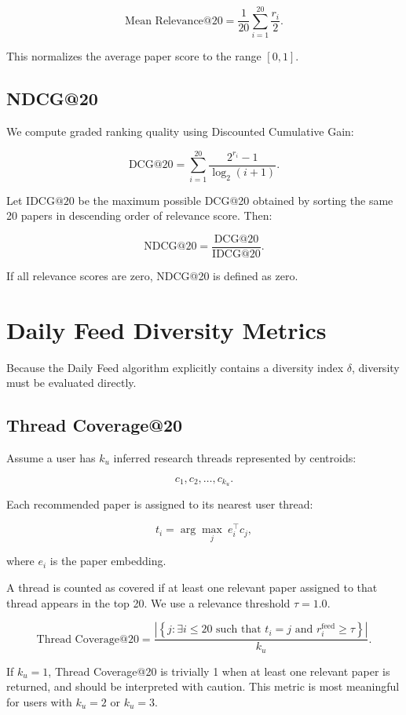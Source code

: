 \documentclass[11pt]{article}
\begin{document}
\[
\text{Mean Relevance@20}
=
\frac{1}{20}\sum_{i=1}^{20}\frac{r_i}{2}.
\]

This normalizes the average paper score to the range $[0,1]$.

\subsection{NDCG@20}

We compute graded ranking quality using Discounted Cumulative Gain:

\[
\text{DCG@20}
=
\sum_{i=1}^{20}
\frac{2^{r_i}-1}{\log_2(i+1)}.
\]

Let $\text{IDCG@20}$ be the maximum possible DCG@20 obtained by sorting the same 20 papers in descending order of relevance score. Then:

\[
\text{NDCG@20}
=
\frac{\text{DCG@20}}{\text{IDCG@20}}.
\]

If all relevance scores are zero, NDCG@20 is defined as zero.

\section{Daily Feed Diversity Metrics}

Because the Daily Feed algorithm explicitly contains a diversity index $\delta$, diversity must be evaluated directly.

\subsection{Thread Coverage@20}

Assume a user has $k_u$ inferred research threads represented by centroids:

\[
c_1, c_2, \ldots, c_{k_u}.
\]

Each recommended paper is assigned to its nearest user thread:

\[
t_i = \arg\max_j \ e_i^\top c_j,
\]

where $e_i$ is the paper embedding.

A thread is counted as covered if at least one relevant paper assigned to that thread appears in the top 20. We use a relevance threshold $\tau = 1.0$.

\[
\text{Thread Coverage@20}
=
\frac{
\left|
\left\{
j :
\exists i \leq 20
\text{ such that }
t_i = j
\text{ and }
r_i^{\text{feed}} \geq \tau
\right\}
\right|
}{
k_u
}.
\]

If $k_u=1$, Thread Coverage@20 is trivially 1 when at least one relevant paper is returned, and should be interpreted with caution. This metric is most meaningful for users with $k_u=2$ or $k_u=3$.
\end{document}
